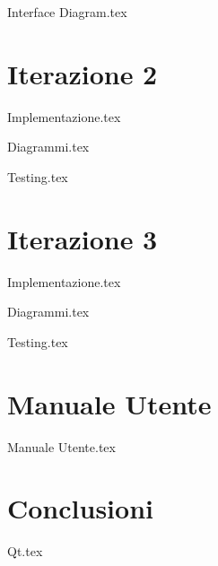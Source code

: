 \documentclass{report}
\begin{document}
	{Interface Diagram.tex}
	
	\clearpage
	
	
	
	\chapter{Iterazione 2}
	{Implementazione.tex}
	
	\clearpage
	
	{Diagrammi.tex}
	
	\clearpage
	
	{Testing.tex}
	
	\clearpage
	
	\chapter{Iterazione 3}
	{Implementazione.tex}
	
	\clearpage
	
	{Diagrammi.tex}
	
	\clearpage
	
	{Testing.tex}
		
	\clearpage
	\chapter{Manuale Utente}
	{Manuale Utente.tex}
	\clearpage
	\chapter{Conclusioni}
	{Qt.tex}
		
	
\end{document}

